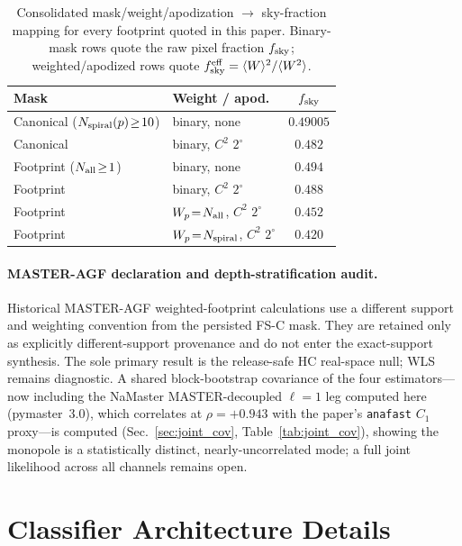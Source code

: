 \documentclass[twocolumn,linenumbers]{aastex702}
\newcommand{\FSC}{\textsc{FS-C}}
\newcommand{\MAGF}{\textsc{MASTER-AGF}}
\begin{document}
\begin{table}[t]
\caption{Consolidated mask/weight/apodization $\to$ sky-fraction mapping for every footprint quoted in this paper. Binary-mask rows quote the raw pixel fraction $f_{\rm sky}$; weighted/apodized rows quote $f_{\rm sky}^{\rm eff}=\langle W\rangle^2/\langle W^2\rangle$.\label{tab:fsky_summary}}
\begin{tabular}{llc}
\textbf{Mask} & \textbf{Weight / apod.} & $f_{\rm sky}$ \\
\hline
Canonical ($N_{\rm spiral}(p)\!\ge\!10$) & binary, none & $0.49005$ \\
Canonical & binary, $C^2$ $2^\circ$ & $0.482$ \\
Footprint ($N_{\rm all}\!\ge\!1$) & binary, none & $0.494$ \\
Footprint & binary, $C^2$ $2^\circ$ & $0.488$ \\
Footprint & $W_p\!=\!N_{\rm all}$, $C^2$ $2^\circ$ & $0.452$ \\
Footprint & $W_p\!=\!N_{\rm spiral}$, $C^2$ $2^\circ$ & $0.420$ \\
\end{tabular}
\end{table}

\paragraph{\MAGF{} declaration and depth-stratification audit.}
Historical \MAGF{} weighted-footprint calculations use a different support and weighting convention from the persisted \FSC{} mask. They are retained only as explicitly different-support provenance and do not enter the exact-support synthesis. The sole primary result is the release-safe HC real-space null; WLS remains diagnostic. A shared block-bootstrap covariance of the four estimators---now including the NaMaster MASTER-decoupled $\ell=1$ leg computed here (pymaster~3.0), which correlates at $\rho=+0.943$ with the paper's \texttt{anafast} $C_1$ proxy---is computed (Sec.~\ref{sec:joint_cov}, Table~\ref{tab:joint_cov}), showing the monopole is a statistically distinct, nearly-uncorrelated mode; a full joint likelihood across all channels remains open.

\section{Classifier Architecture Details}
\label{sec:app_classifier}
\end{document}
